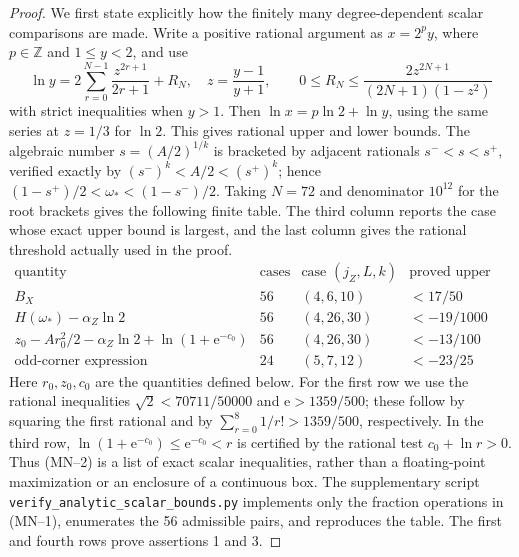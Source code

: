 \documentclass[11pt]{article}
\theoremstyle{definition}
\begin{document}
\begin{proof}
We first state explicitly how the finitely many degree-dependent scalar
comparisons are made.  Write a positive rational argument as
\(x=2^py\), where \(p\in\mathbb Z\) and \(1\le y<2\), and use
\[
 \ln y=2\sum_{r=0}^{N-1}\frac{z^{2r+1}}{2r+1}+R_N,
 \quad z=\frac{y-1}{y+1},\qquad
 0\le R_N\le\frac{2z^{2N+1}}{(2N+1)(1-z^2)}            \tag{MN--1}
\]
with strict inequalities when \(y>1\).  Then
\(\ln x=p\ln2+\ln y\), using the same series at \(z=1/3\) for
\(\ln2\).  This gives rational upper and lower bounds.  The algebraic number
\(s=(A/2)^{1/k}\) is bracketed by adjacent rationals \(s^-<s<s^+\),
verified exactly by \((s^-)^k<A/2<(s^+)^k\); hence
\((1-s^+)/2<\omega_*<(1-s^-)/2\).  Taking \(N=72\) and denominator
\(10^{12}\) for the root brackets gives the following finite table.
The third column reports the case whose exact upper bound is largest, and
the last column gives the rational threshold actually used in the proof.
\[
\begin{array}{l|c|c|c}
\text{quantity}&\text{cases}&\text{case }(j_Z,L,k)&
 \text{proved upper bound}\\ \hline
B_X&56&(4,6,10)& <17/50\\
H(\omega_*)-\alpha_Z\ln2&56&(4,26,30)&<-19/1000\\
z_0-Ar_0^2/2-\alpha_Z\ln2+\ln(1+\mathrm e^{-c_0})
 &56&(4,26,30)&<-13/100\\
\text{odd-corner expression}&24&(5,7,12)&<-23/25
\end{array}                                                     \tag{MN--2}
\]
Here \(r_0,z_0,c_0\) are the quantities defined below.  For the first
row we use the rational inequalities
\(\sqrt2<70711/50000\) and \(\mathrm e>1359/500\); these follow by
squaring the first rational and by
\(\sum_{r=0}^8 1/r!>1359/500\), respectively.  In the third row,
\(\ln(1+\mathrm e^{-c_0})\le\mathrm e^{-c_0}<r\) is certified by the
rational test \(c_0+\ln r>0\).  Thus (MN--2) is a list of exact scalar
inequalities, rather than a floating-point maximization or an enclosure
of a continuous box.  The supplementary script
\texttt{verify\_analytic\_scalar\_bounds.py} implements only the fraction
operations in (MN--1), enumerates the 56 admissible pairs, and reproduces
the table.  The first and fourth rows prove assertions 1 and 3.


\end{proof}
\end{document}
